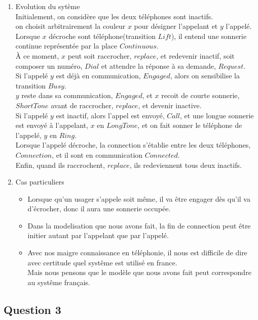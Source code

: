 \begin{enumerate}
\item Evolution du sytème\\
Initialement, on considère que les deux téléphones sont inactifs.\\
on choisit arbitrairement la couleur $x$ pour désigner l'appelant et $y$ l'appelé.\\
Lorsque $x$ décroche sont téléphone(transition $Lift$), il entend une sonnerie continue représentée par la place $Continuous$.\\
À ce moment, $x$ peut soit raccrocher, $replace$, et redevenir inactif, soit composer un numéro, $Dial$ et attendre la réponse à sa demande, $Request$.\\
Si l'appelé $y$ est déjà en communication, $Engaged$, alors on sensibilise la transition $Busy$.\\
$y$ reste dans sa communication, $Engaged$, et $x$ recoit de courte sonnerie, $Short Tone$ avant de raccrocher, $replace$, et devenir inactive.\\
Si l'appelé $y$ est inactif, alors l'appel est envoyé, $Call$, et une longue sonnerie est envoyé à l'appelant, $x$ en $Long Tone$, et on fait sonner le téléphone de l'appelé, $y$ en $Ring$.\\
Lorsque l'appelé décroche, la connection s'établie entre les deux téléphones, $Connection$, et il sont en communication $Connected$.\\
Enfin, quand ils raccrochent, $replace$, ils redeviennent tous deux inactifs.

\item Cas particuliers
  \begin{itemize}
    \item Lorsque qu'un usager s'appele soit même, il va être engager dès qu'il va d'écrocher, donc il aura une sonnerie occupée. 
    \item Dans la modelisation que nous avons fait, la fin de connection peut être initier autant par l'appelant que par l'appelé.
    \item Avec nos maigre connaissance en téléphonie, il nous est difficile de dire avec certitude quel systême est utilisé en france.\\
Mais nous pensons que le modèle que nous avons fait peut correspondre au systême français.

  \end{itemize}
\end{enumerate}
\subsection{Question 3}
